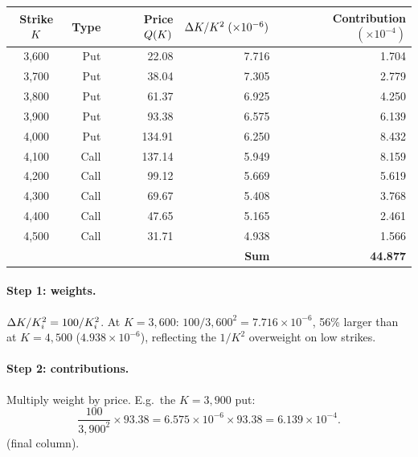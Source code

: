 \begin{center}
\begin{tabular}{crrrr}
  \toprule
  Strike $K$ & Type & Price $Q(K)$ &
    $\Delta K / K^2\;(\times 10^{-6})$ &
    Contribution $(\times 10^{-4})$ \\
  \midrule
  3{,}600 & Put  &  22.08 & 7.716 & 1.704 \\
  3{,}700 & Put  &  38.04 & 7.305 & 2.779 \\
  3{,}800 & Put  &  61.37 & 6.925 & 4.250 \\
  3{,}900 & Put  &  93.38 & 6.575 & 6.139 \\
  4{,}000 & Put  & 134.91 & 6.250 & 8.432 \\
  4{,}100 & Call & 137.14 & 5.949 & 8.159 \\
  4{,}200 & Call &  99.12 & 5.669 & 5.619 \\
  4{,}300 & Call &  69.67 & 5.408 & 3.768 \\
  4{,}400 & Call &  47.65 & 5.165 & 2.461 \\
  4{,}500 & Call &  31.71 & 4.938 & 1.566 \\
  \midrule
  \multicolumn{4}{r}{\textbf{Sum}} & \textbf{44.877} \\
  \bottomrule
\end{tabular}
\end{center}

\paragraph{Step 1: weights.}
$\Delta K/K_i^2 = 100/K_i^2$. At $K=3{,}600$:
$100/3{,}600^2 = 7.716\times 10^{-6}$, 56\% larger than at $K=4{,}500$
($4.938\times 10^{-6}$), reflecting the $1/K^2$ overweight on low strikes.

\paragraph{Step 2: contributions.}
Multiply weight by price. E.g.\ the $K=3{,}900$ put:
\[
  \frac{100}{3{,}900^2} \times 93.38
  = 6.575 \times 10^{-6} \times 93.38
  = 6.139 \times 10^{-4}.
\]
(final column).

